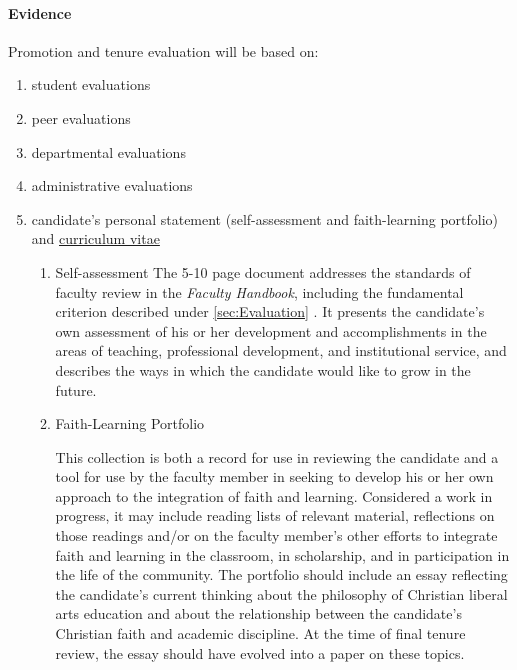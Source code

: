 			\paragraph{Evidence}
				Promotion and tenure evaluation will be based on:
				\begin{enumerate}[label=\alph*)]
					\item{student evaluations}
					\item{peer evaluations}
					\item{departmental evaluations}
					\item{administrative evaluations}
					\item{candidate's personal statement (self-assessment and faith-learning portfolio) and \underline{curriculum vitae}

						\begin{enumerate}[label=\arabic*)]
							\item{Self-assessment}
							The 5-10 page document addresses the standards of faculty review in the \emph{Faculty Handbook}, including the fundamental criterion described under
							\ref{sec:Evaluation}
							.  It presents the candidate's own assessment of his or her development and accomplishments in the areas of teaching, professional development, and institutional service, and describes the ways in which the candidate would like to grow in the future.
							\item{Faith-Learning Portfolio}

							This collection is both a record for use in
							reviewing the candidate and a tool for use by the
							faculty member in seeking to develop his or her own
							approach to the integration of faith and learning.
							Considered a work in progress, it may include
							reading lists of relevant material, reflections on
							those readings and/or on the faculty member's other
							efforts to integrate faith and learning in the
							classroom, in scholarship, and in participation in
							the life of the community.  The portfolio should
							include an essay reflecting the candidate's current
							thinking about the philosophy of Christian liberal
							arts education and about the relationship between
							the candidate's Christian faith and academic
							discipline.  At the time of final tenure review, the
							essay should have evolved into a  paper on
							these topics.

						\end{enumerate}
					}
				\end{enumerate}
